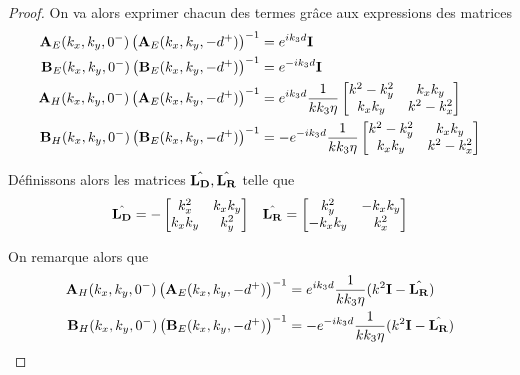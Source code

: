 \begin{proof}
            On va alors exprimer chacun des termes grâce aux expressions des matrices
            \begin{align}
                \mathbf{A}_E(k_x,k_y,0^-)\left(\mathbf{A}_E(k_x,k_y,-d^+)\right)^{-1} &= e^{ik_3d}\mathbf{I}
                \\
                \mathbf{B}_E(k_x,k_y,0^-)\left(\mathbf{B}_E(k_x,k_y,-d^+)\right)^{-1} &= e^{-ik_3d}\mathbf{I}
                \\
                \mathbf{A}_H(k_x,k_y,0^-)\left(\mathbf{A}_E(k_x,k_y,-d^+)\right)^{-1} &= e^{ik_3d}\dfrac{1}{kk_3\eta}
                \begin{bmatrix}
                    k^2 - k_y^2 & k_x k_y
                    \\
                    k_x k _y & k^2 - k_x^2
                \end{bmatrix}
                \\
                \mathbf{B}_H(k_x,k_y,0^-)\left(\mathbf{B}_E(k_x,k_y,-d^+)\right)^{-1} &= -e^{-ik_3d}\dfrac{1}{kk_3\eta}
                    \begin{bmatrix}
                    k^2 - k_y^2 & k_x k_y
                    \\
                    k_x k _y & k^2 - k_x^2
                \end{bmatrix} 
            \end{align}

            Définissons alors les matrices \(\hat{\mathbf{L_D}},\hat{\mathbf{L_R}}\) telle que
            \begin{align}
                \hat{\mathbf{L_D}} = -\begin{bmatrix}
                k_x^2 & k_x k_y
                \\
                k_x k _y & k_y^2
                \end{bmatrix}
                & & 
                \hat{\mathbf{L_R}} = \begin{bmatrix}
                k_y^2 & -k_x k_y
                \\
                -k_x k _y &  k_x^2
                \end{bmatrix}
            \end{align}

            On remarque alors que 
            \begin{align}
                \mathbf{A}_H(k_x,k_y,0^-)\left(\mathbf{A}_E(k_x,k_y,-d^+)\right)^{-1} &=  e^{ik_3d}\dfrac{1}{kk_3\eta}(k^2\mathbf{I}  -\hat{\mathbf{L_R}})
                \\
                \mathbf{B}_H(k_x,k_y,0^-)\left(\mathbf{B}_E(k_x,k_y,-d^+)\right)^{-1} &= -e^{-ik_3d}\dfrac{1}{kk_3\eta}(k^2\mathbf{I}  -\hat{\mathbf{L_R}})
            \end{align}


\end{proof}
